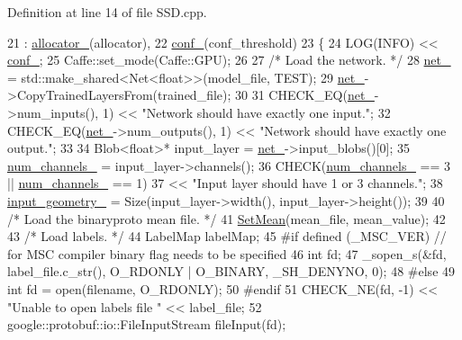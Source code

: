 Definition at line 14 of file S\+S\+D.\+cpp.


\begin{DoxyCode}
21     : \mbox{\hyperlink{class_s_s_d_af45a3ca33b8adcb4b2e23ebd23891947}{allocator\_}}(allocator),
22       \mbox{\hyperlink{class_s_s_d_a2deab37585140ff74fbec6e54f5407bf}{conf\_}}(conf\_threshold)
23 \{
24     LOG(INFO) << \mbox{\hyperlink{class_s_s_d_a2deab37585140ff74fbec6e54f5407bf}{conf\_}};
25     Caffe::set\_mode(Caffe::GPU);
26 
27     \textcolor{comment}{/* Load the network. */}
28     \mbox{\hyperlink{class_s_s_d_a9b70501b85252c3135030e5c6c1e7117}{net\_}} = std::make\_shared<Net<float>>(model\_file, TEST);
29     \mbox{\hyperlink{class_s_s_d_a9b70501b85252c3135030e5c6c1e7117}{net\_}}->CopyTrainedLayersFrom(trained\_file);
30 
31     CHECK\_EQ(\mbox{\hyperlink{class_s_s_d_a9b70501b85252c3135030e5c6c1e7117}{net\_}}->num\_inputs(), 1) << \textcolor{stringliteral}{"Network should have exactly one input."};
32     CHECK\_EQ(\mbox{\hyperlink{class_s_s_d_a9b70501b85252c3135030e5c6c1e7117}{net\_}}->num\_outputs(), 1) << \textcolor{stringliteral}{"Network should have exactly one output."};
33 
34     Blob<float>* input\_layer = \mbox{\hyperlink{class_s_s_d_a9b70501b85252c3135030e5c6c1e7117}{net\_}}->input\_blobs()[0];
35     \mbox{\hyperlink{class_s_s_d_affe6f7e948b0040bd958db34758d8ab1}{num\_channels\_}} = input\_layer->channels();
36     CHECK(\mbox{\hyperlink{class_s_s_d_affe6f7e948b0040bd958db34758d8ab1}{num\_channels\_}} == 3 || \mbox{\hyperlink{class_s_s_d_affe6f7e948b0040bd958db34758d8ab1}{num\_channels\_}} == 1)
37         << \textcolor{stringliteral}{"Input layer should have 1 or 3 channels."};
38     \mbox{\hyperlink{class_s_s_d_a3fe828551a5a53a3f43a481ae5d2d96a}{input\_geometry\_}} = Size(input\_layer->width(), input\_layer->height());
39 
40     \textcolor{comment}{/* Load the binaryproto mean file. */}
41     \mbox{\hyperlink{class_s_s_d_ada3debdd0e04185587f13b44a6b63765}{SetMean}}(mean\_file, mean\_value);
42 
43     \textcolor{comment}{/* Load labels. */}
44     LabelMap labelMap;
45 \textcolor{preprocessor}{#if defined (\_MSC\_VER)  // for MSC compiler binary flag needs to be specified}
46     \textcolor{keywordtype}{int} fd;
47     \_sopen\_s(&fd, label\_file.c\_str(), O\_RDONLY | O\_BINARY, \_SH\_DENYNO, 0);
48 \textcolor{preprocessor}{#else}
49     \textcolor{keywordtype}{int} fd = open(filename, O\_RDONLY);
50 \textcolor{preprocessor}{#endif}
51     CHECK\_NE(fd, -1) << \textcolor{stringliteral}{"Unable to open labels file "} << label\_file;
52     google::protobuf::io::FileInputStream fileInput(fd);

\end{DoxyCode}
